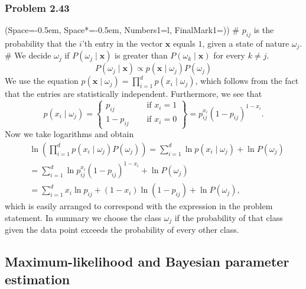\documentclass[12pt, a4paper]{article}
\newcommand{\listSpace}{-0.5em}%
\newcommand{\vect}[1]{\bm{#1}}
\begin{document}
\subsubsection*{Problem 2.43}
\begin{easylist}[enumerate]
	\ListProperties(Space=\listSpace, Space*=\listSpace, Numbers1=l, FinalMark1={)})
	# $p_{ij}$ is the probability that the $i$'th entry in the vector $\vect{x}$ equals $1$, given a state of nature $\omega_j$.
	# We decide $\omega_j$ if $P(\omega_j  \mid  \vect{x})$ is greater than $P(\omega_k  \mid  \vect{x})$ for every $k \neq j$.
	\begin{equation*}
	P(\omega_j  \mid  \vect{x}) \propto p(  \vect{x}  \mid  \omega_j) P(\omega_j)
	\end{equation*}
	We use the equation $p(  \vect{x}  \mid  \omega_j) = \prod_{i = 1}^{d} p(  x_i \mid  \omega_j)$, which follows from the fact that the entries are statistically independent.
	Furthermore, we see that
	\begin{equation*}
	p(  x_i \mid  \omega_j) = 
	\left\{\!\begin{aligned}
	p_{ij} &\quad \text{ if } x_i = 1 \\
	1 - p_{ij} &\quad \text{ if } x_i = 0 
	\end{aligned}\right\} = 
	p_{ij}^{x_i} \left( 1 - p_{ij}\right)^{ 1 - x_i}.
	\end{equation*}
	Now we take logarithms and  obtain
	\begin{align*}
	& \ln \left( \prod_{i = 1}^{d} p(  x_i \mid  \omega_j) P(\omega_j) \right) =
	\sum_{i = 1}^{d} \ln p(  x_i \mid  \omega_j)  + \ln P(\omega_j) \\
	& = \sum_{i = 1}^{d} \ln p_{ij}^{x_i} \left( 1 - p_{ij}\right)^{ 1 - x_i}  + \ln P(\omega_j) \\
	&
	= \sum_{i = 1}^{d} x_i \ln p_{ij} + (1 - x_i) \ln ( 1 - p_{ij})  + \ln P(\omega_j),
	\end{align*}
	which is easily arranged to correspond with the expression in the problem statement. 
	In summary we choose the class $\omega_j$ if the probability of that class given the data point exceeds the probability of every other class.
\end{easylist}



\clearpage
\subsection{Maximum-likelihood and Bayesian parameter estimation}
\end{document}

